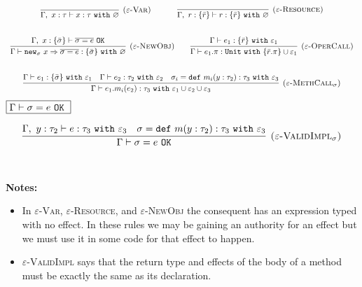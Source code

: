 \documentclass{llncs}
\newcommand{\keywadj}[1]{\mathtt{#1}}
\newcommand{\keyw}[1]{\keywadj{#1}~}
\newcommand{\type}[2]{
	#1~\keyw{with} #2
}
\newcommand{\newsig}[0]{
	\keywadj{new}_\sigma~x \Rightarrow \overline{\sigma = e}
}
\begin{document}
\[
\begin{array}{c}
\infer[\textsc{($\varepsilon$-Var)}]
  {\Gamma,~x:\tau \vdash x: \type{\tau}{\varnothing} }
  {} 
~~~~~~~~~~
\infer[\textsc{($\varepsilon$-Resource)}]
  {\Gamma,~r :\{\bar r\} \vdash r: \type{   \{ \bar r \}  }{\varnothing}}
  {} \\[5ex]

\infer[\textsc{($\varepsilon$-NewObj)}]
	{\Gamma \vdash \newsig : \{ \bar \sigma \}~\keyw{with} \varnothing}
	{\Gamma,~x : \{ \bar \sigma \} \vdash \overline{\sigma = e}~\keywadj{OK}} ~~~~~~

\infer[\textsc{($\varepsilon$-OperCall)}]
	{\Gamma \vdash e_1.\pi : \keyw{Unit} \keyw{with} \{ \bar r.\pi \} \cup \varepsilon_1}
	{\Gamma \vdash e_1 : \{ \bar r \}~ \keyw{with} \varepsilon_1} \\[5ex]
	
\infer[\textsc{($\varepsilon$-MethCall$_\sigma$)}]
	{\Gamma \vdash e_1.m_i(e_2):\tau_3~\keyw{with} \varepsilon_1 \cup \varepsilon_2 \cup \varepsilon_3}
	{\Gamma \vdash e_1 : \{ \bar \sigma \}~\keyw{with} \varepsilon_1 & \Gamma \vdash e_2 : \tau_2~\keyw{with} \varepsilon_2 & \sigma_i = \keyw{def} m_i(y:\tau_2):\tau_3~\keyw{with} \varepsilon_3}

\end{array}
\]
\noindent
$\fbox{$\Gamma \vdash \sigma = e~\keyw{OK}$}$

\[
\begin{array}{c}
\infer[\textsc{($\varepsilon$-ValidImpl$_\sigma$)}]
	{\Gamma \vdash \sigma = e~\keywadj{OK}}
	{\Gamma,~y:\tau_2 \vdash e: \tau_3~\keyw{with} \varepsilon_3 & \sigma = \keyw{def} m(y:\tau_2):\tau_3~\keyw{with} \varepsilon_3} \\[5ex]
\end{array}
\]

\noindent \textbf{Notes:}

\begin{itemize}
	\item In \textsc{$\varepsilon$-Var}, \textsc{$\varepsilon$-Resource}, and \textsc{$\varepsilon$-NewObj} the consequent has an expression typed with no effect. In these rules we may be gaining an authority for an effect but we must use it in some code for that effect to happen.
	\item \textsc{$\varepsilon$-ValidImpl} says that the return type and effects of the body of a method must be exactly the same as its declaration.
\end{itemize}
\end{document}
